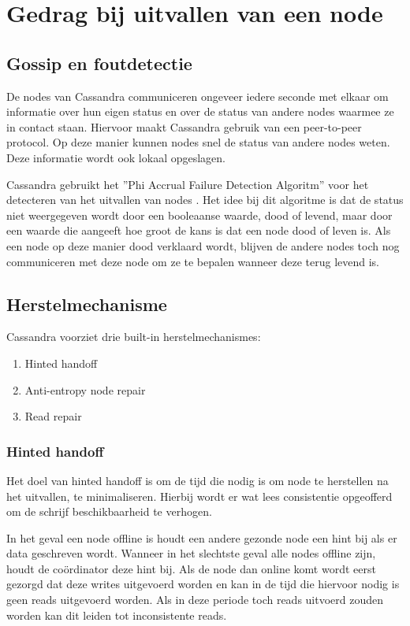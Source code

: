 \chapter{Gedrag bij uitvallen van een node}
\label{ch:cassandra_uitval}

\section{Gossip en foutdetectie}
De nodes van Cassandra communiceren ongeveer iedere seconde met elkaar om informatie over hun eigen status en over de status van andere nodes waarmee ze in contact staan.
Hiervoor maakt Cassandra gebruik van een peer-to-peer protocol.
Op deze manier kunnen nodes snel de status van andere nodes weten.
Deze informatie wordt ook lokaal opgeslagen.

Cassandra gebruikt het ''Phi Accrual Failure Detection Algoritm'' voor het detecteren van het uitvallen van nodes \citep{kan2014cassandra}.
Het idee bij dit algoritme is dat de status niet weergegeven wordt door een booleaanse waarde, dood of levend, maar door een waarde die aangeeft hoe groot de kans is dat een node dood of leven is.
Als een node op deze manier dood verklaard wordt, blijven de andere nodes toch nog communiceren met deze node om ze te bepalen wanneer deze terug levend is.

\section{Herstelmechanisme}
Cassandra voorziet drie built-in herstelmechanismes:

\begin{enumerate}
	\item Hinted handoff
	\item Anti-entropy node repair
	\item Read repair
\end{enumerate}

\subsection{Hinted handoff}
Het doel van hinted handoff is om de tijd die nodig is om node te herstellen na het uitvallen, te minimaliseren.
Hierbij wordt er wat lees consistentie opgeofferd om de schrijf beschikbaarheid te verhogen.

In het geval een node offline is houdt een andere gezonde node een hint bij als er data geschreven wordt.
Wanneer in het slechtste geval alle nodes offline zijn, houdt de coördinator deze hint bij.
Als de node dan online komt wordt eerst gezorgd dat deze writes uitgevoerd worden en kan in de tijd die hiervoor nodig is geen reads uitgevoerd worden.
Als in deze periode toch reads uitvoerd zouden worden kan dit leiden tot inconsistente reads.

